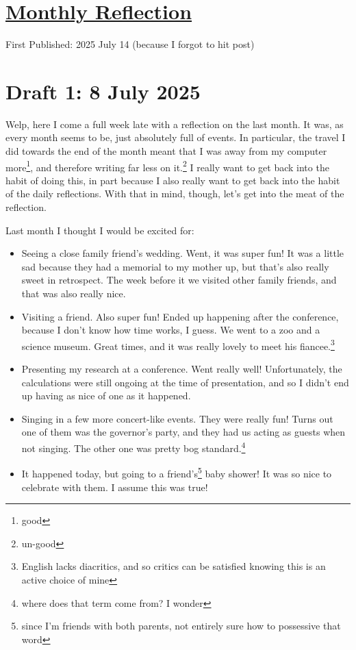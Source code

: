 \documentclass[12pt]{article}
\renewcommand{\,}{\textsuperscript{,}}
\begin{document}
  
\doublespacing  
\section{\href{reflection-june-25.html}{Monthly Reflection}}  
First Published: 2025 July 14 (because I forgot to hit post)

\section{Draft 1: 8 July 2025}

Welp, here I come a full week late with a reflection on the last month.  
It was, as every month seems to be, just absolutely full of events.  
In particular, the travel I did towards the end of the month meant that I was away from my computer more\footnote{good}, and therefore writing far less on it.\footnote{un-good}  
I really want to get back into the habit of doing this, in part because I also really want to get back into the habit of the daily reflections.  
With that in mind, though, let's get into the meat of the reflection.

Last month I thought I would be excited for:

\begin{itemize}

\item Seeing a close family friend's wedding. Went, it was super fun! It was a little sad because they had a memorial to my mother up, but that's also really sweet in retrospect. The week before it we visited other family friends, and that was also really nice.

\item Visiting a friend. Also super fun! Ended up happening after the conference, because I don't know how time works, I guess. We went to a zoo and a science museum. Great times, and it was really lovely to meet his fiancee.\footnote{English lacks diacritics, and so critics can be satisfied knowing this is an active choice of mine}

\item Presenting my research at a conference. Went really well! Unfortunately, the calculations were still ongoing at the time of presentation, and so I didn't end up having as nice of one as it happened.

\item Singing in a few more concert-like events. They were really fun! Turns out one of them was the governor's party, and they had us acting as guests when not singing.  
The other one was pretty bog standard.\footnote{where does that term come from? I wonder}

\item It happened today, but going to a friend's\footnote{since I'm friends with both parents, not entirely sure how to possessive that word} baby shower! It was so nice to celebrate with them.  
I assume this was true!

\end{itemize}
\end{document}
